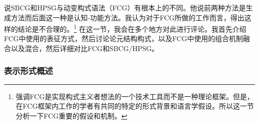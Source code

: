 说SBCG和HPSG与动变构式语法（FCG）有根本上的不同。他说前两种方法是生成方法而后面这一种是认知-功能方法。我认为对于FCG所做的工作而言，得出这样的结论是不合理的。\footnote{\label{Steels-FCG-System}%
   \citet[]{Steels2013a}强调FCG是实现构式主义者想法的一个技术工具而不是一种理论框架。但是，在FCG框架内工作的学者有共同的特定的形式背景和语言学假设。所以这一节分析一下FCG重要的假设和机制。} 在这一节，我会在多个地方对此进行评论。我首先介绍FCG中使用的表征方式，然后讨论论元结构构式，以及FCG中使用的组合机制融合以及混合，然后详细对比FCG和SBCG/HPSG。

\subsubsection{表示形式概述}

